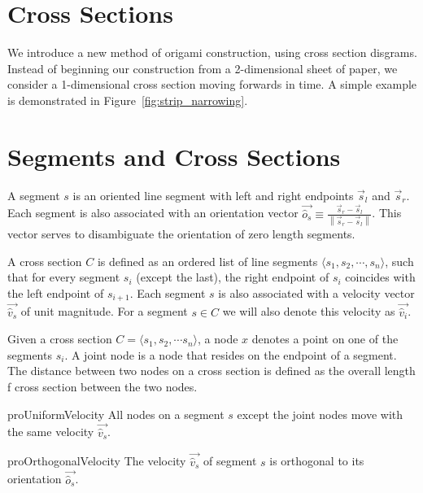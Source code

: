 \section{Cross Sections}
\label{sec:cross_sections}

We introduce a new method of origami construction, using cross section disgrams.
Instead of beginning our construction from a 2-dimensional sheet of paper,
we consider a 1-dimensional cross section moving forwards in time.
A simple example is demonstrated in Figure~\ref{fig:strip_narrowing}.

\section{Segments and Cross Sections}
\label{sec:segments_and_cross_sections}

\begin{definition}
\label{def:segment}
A segment $s$ is an oriented line segment with left and right endpoints $\vec s_l$ and $\vec s_r$.
Each segment is also associated with an orientation vector $\vec{\hat o_s} \equiv\frac{\vec s_r-\vec s_l}{ \left\| \vec s_r-\vec s_l\right\|}$.
This vector serves to disambiguate the orientation of zero length segments.
\end{definition}

\begin{definition}
\label{def:cross_section}
A cross section $C$ is defined as an ordered list of line segments $\langle s_1,s_2,\cdots,s_n\rangle$,
such that for every segment $s_i$ (except the last),
the right endpoint of $s_i$ coincides with the left endpoint of $s_{i+1}$.
Each segment $s$ is also associated with a velocity vector $\vec{\hat v_s}$ of unit magnitude.
For a segment $s\in C$ we will also denote this velocity as $\vec{\hat v_i}$.
\end{definition}

\begin{definition}
\label{def:node}
Given a cross section $C = \langle s_1, s_2,\cdots s_n \rangle$, a node $x$ denotes a point on one of the segments $s_i$.
A joint node is a node that resides on the endpoint of a segment.
The distance between two nodes on a cross section is defined as the overall length f cross section between the two nodes.
\end{definition}

\begin{restatable}{pro}{UniformVelocity}
\label{pro:uniform_velocity}
All nodes on a segment $s$ except the joint nodes move with the same velocity $\vec{\hat v_s}$.
\end{restatable}

\begin{restatable}{pro}{OrthogonalVelocity}
\label{pro:orthogonal_velocity}
The velocity $\vec{\hat v_s}$ of segment $s$ is orthogonal to its orientation $\vec{\hat o_s}$.
\end{restatable}





%
